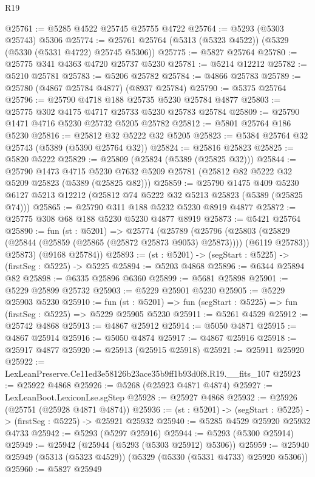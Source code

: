 \begin{lexlean}{R19}
\begin{coremodule}
@25761 := @5285 @4522 @25745 @25755 @4722
@25764 := @5293 (@5303 @25743) @5306
@25774 := @25761 @25764 (@5313 (@5323 @4522)) (@5329 (@5330 (@5331 @4722) @25745 @5306))
@25775 := @5827 @25764
@25780 := @25775 @341 @4363 @4720 @25737 @5230
@25781 := @5214 @12212
@25782 := @5210 @25781
@25783 := @5206 @25782
@25784 := @4866 @25783
@25789 := @25780 (@4867 @25784 @4877) (@8937 @25784)
@25790 := @5375 @25764
@25796 := @25790 @4718 @188 @25735 @5230 @25784 @4877
@25803 := @25775 @302 @4175 @4717 @25733 @5230 @25783 @25784
@25809 := @25790 @1471 @4716 @5230 @25732 @5205 @25782
@25812 := @5801 @25764 @186 @5230
@25816 := @25812 @32 @5222 @32 @5205
@25823 := @5384 @25764 @32 @25743 (@5389 (@5390 @25764 @32))
@25824 := @25816 @25823
@25825 := @5820 @5222
@25829 := @25809 (@25824 (@5389 (@25825 @32)))
@25844 := @25790
    @1473
    @4715
    @5230
    @7632
    @5209
    @25781
    (@25812 @82 @5222 @32 @5209 @25823 (@5389 (@25825 @82)))
@25859 := @25790
    @1475
    @409
    @5230
    @6127
    @5213
    @12212
    (@25812 @74 @5222 @32 @5213 @25823 (@5389 (@25825 @74)))
@25865 := @25790 @311 @188 @5232 @5230 @8919 @4877
@25872 := @25775 @308 @68 @188 @5230 @5230 @4877 @8919
@25873 := @5421 @25764
@25890 := fun (st : @5201) =>
  @25774
    (@25789
      (@25796
        (@25803 (@25829 (@25844 (@25859 (@25865 (@25872 @25873 @9053) @25873)))) (@6119 @25783))
        @25873)
      (@9168 @25784))
@25893 := (st : @5201) -> (segStart : @5225) -> (firstSeg : @5225) -> @5225
@25894 := @5203 @4868
@25896 := @6344 @25894 @82
@25898 := @6335 @25896 @6360
@25899 := @5681 @25898
@25901 := @5229 @25899 @25732
@25903 := @5229 @25901 @5230
@25905 := @5229 @25903 @5230
@25910 := fun (st : @5201) => fun (segStart : @5225) => fun (firstSeg : @5225) => @5229 @25905 @5230
@25911 := @5261 @4529
@25912 := @25742 @4868
@25913 := @4867 @25912
@25914 := @5050 @4871
@25915 := @4867 @25914
@25916 := @5050 @4874
@25917 := @4867 @25916
@25918 := @25917 @4877
@25920 := @25913 (@25915 @25918)
@25921 := @25911 @25920
@25922 := LexLeanPreserve.Ce11ed3e58126b23ace35b9ff1b93d0f8.R19.__fits_107
@25923 := @25922 @4868
@25926 := @5268 (@25923 @4871 @4874)
@25927 := LexLeanBoot.LexiconLse.sgStep
@25928 := @25927 @4868
@25932 := @25926 (@25751 (@25928 @4871 @4874))
@25936 := (st : @5201) -> (segStart : @5225) -> (firstSeg : @5225) -> @25921 @25932
@25940 := @5285 @4529 @25920 @25932 @4733
@25942 := @5293 (@5297 @25916)
@25944 := @5293 (@5300 @25914)
@25949 := @25942 (@25944 (@5293 (@5303 @25912) @5306))
@25959 := @25940 @25949 (@5313 (@5323 @4529)) (@5329 (@5330 (@5331 @4733) @25920 @5306))
@25960 := @5827 @25949

\end{coremodule}
\end{lexlean}

